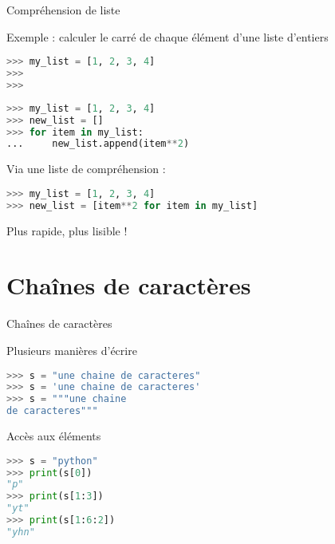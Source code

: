 \begin{frame}[fragile]{Compréhension de liste}

Exemple : calculer le carré de chaque élément d'une liste d'entiers

\begin{overprint}
  

\begin{lstlisting}[language=Python, morekeywords={True, false}, numbers=none]
>>> my_list = [1, 2, 3, 4]
>>>
>>> 

\end{lstlisting}



\begin{lstlisting}[language=Python, morekeywords={True, false}, numbers=none]
>>> my_list = [1, 2, 3, 4]
>>> new_list = []
>>> for item in my_list:
...     new_list.append(item**2)
\end{lstlisting}

\end{overprint}


Via une liste de compréhension :
\begin{lstlisting}[language=Python, morekeywords={True, false}, numbers=none]
>>> my_list = [1, 2, 3, 4]
>>> new_list = [item**2 for item in my_list]
\end{lstlisting}

Plus rapide, plus lisible !
\end{frame}






\section{Chaînes de caractères}


\begin{frame}[fragile]{Chaînes de caractères}

  \begin{block}{Plusieurs manières d'écrire}
    \medskip
\begin{lstlisting}[language=Python, numbers=none]
>>> s = "une chaine de caracteres"
>>> s = 'une chaine de caracteres'
>>> s = """une chaine 
de caracteres"""
\end{lstlisting}
  \end{block}

  \begin{block}{Accès aux éléments}
  \medskip
\begin{lstlisting}[language=Python, numbers=none]
>>> s = "python"
>>> print(s[0])
"p"
>>> print(s[1:3])
"yt"
>>> print(s[1:6:2])
"yhn"\end{lstlisting}
\end{block}

\end{frame}








